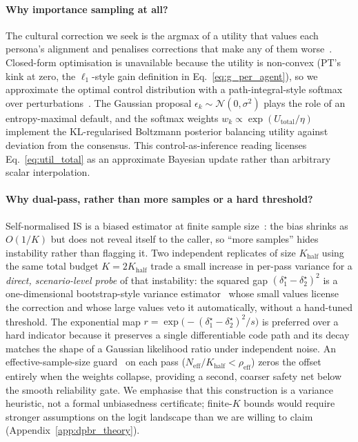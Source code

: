 \documentclass{article}
\begin{document}
\paragraph{Why importance sampling at all?}
The cultural correction we seek is the argmax of a utility that values each
persona's alignment and penalises corrections that make any of them
worse~\citep{levine2018reinforcement}. Closed-form optimisation is unavailable
because the utility is non-convex (PT's kink at zero, the $\ell_1$-style gain
definition in Eq.~\ref{eq:g_per_agent}), so we approximate the optimal control
distribution with a path-integral-style softmax over
perturbations~\citep{williams2017mppi, todorov2009generalized}.
The Gaussian proposal $\epsilon_k\sim\mathcal{N}(0,\sigma^2)$ plays the role
of an entropy-maximal default, and the softmax weights
$w_k\propto\exp(U_{\text{total}}/\eta)$ implement the KL-regularised Boltzmann
posterior balancing utility against deviation from the consensus. This
control-as-inference reading licenses Eq.~\ref{eq:util_total} as an
approximate Bayesian update rather than arbitrary scalar interpolation.

\paragraph{Why dual-pass, rather than more samples or a hard threshold?}
Self-normalised IS is a biased estimator at finite sample
size~\citep{elvira2021advances}: the bias shrinks as $O(1/K)$ but does not
reveal itself to the caller, so ``more samples'' hides instability rather than
flagging it. Two independent replicates of size $K_{\text{half}}$ using the
same total budget $K{=}2K_{\text{half}}$ trade a small increase in per-pass
variance for a \emph{direct, scenario-level probe} of that instability: the
squared gap $(\delta^\star_1-\delta^\star_2)^2$ is a one-dimensional
bootstrap-style variance estimator~\citep{efron1979bootstrap} whose small
values license the correction and whose large values veto it automatically,
without a hand-tuned threshold. The exponential map
$r{=}\exp\!\bigl(-(\delta^\star_1-\delta^\star_2)^2/s\bigr)$ is preferred over
a hard indicator because it preserves a single differentiable code path and
its decay matches the shape of a Gaussian likelihood ratio under independent
noise. An effective-sample-size guard~\citep{kish1965survey} on each pass
($N_{\text{eff}}/K_{\text{half}}{<}\rho_{\text{eff}}$) zeros the offset
entirely when the weights collapse, providing a second, coarser safety net
below the smooth reliability gate. We emphasise that this construction is a
variance heuristic, not a formal unbiasedness certificate; finite-$K$ bounds
would require stronger assumptions on the logit landscape than we are willing
to claim (Appendix~\ref{app:dpbr_theory}).
\end{document}
